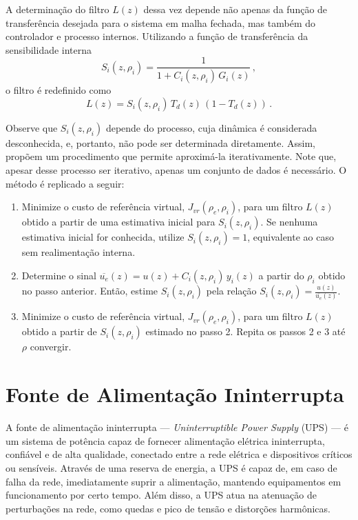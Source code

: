 \documentclass[repeatfields,oneside]{tcc}
\newcommand{\mycdot}{ \, }
\newcommand{\myC}[2][]{ C_{#1} \left( #2 \right) }
\newcommand{\myG}[2][]{ G_{#1} \left( #2 \right) }
\newcommand{\myCzrho}[1]{ \myC[#1]{z, \rho_{#1}} }
\begin{document}
A determinação do filtro $L(z)$ dessa vez depende não apenas da função de transferência desejada para o sistema em malha fechada, mas também do controlador e processo internos.
Utilizando a função de transferência da sensibilidade interna
\begin{equation}\label{eq:VRFT_cascade1_S}
    S_i(z, \rho_i) = \dfrac{ 1 }{ 1 + \myCzrho{i} \mycdot \myG[i]{z} }
    \,,
\end{equation}
o filtro é redefinido como
\begin{equation}\label{eq:VRFT_cascade1_L}
    L(z) = S_i(z, \rho_i) \mycdot T_d(z) \mycdot \left( 1 - T_d(z) \right)
    \,.
\end{equation}

Observe que $S_i(z, \rho_i)$ depende do processo, cuja dinâmica é considerada desconhecida, e, portanto, não pode ser determinada diretamente.
Assim, \textcite{Chrystian2020} propõem um procedimento que permite aproximá-la iterativamente.
Note que, apesar desse processo ser iterativo, apenas um conjunto de dados é necessário.
O método é replicado a seguir:
\begin{enumerate}
    \item Minimize o custo de referência virtual, $J_{vr} \left( \rho_e, \rho_i \right)$, para um filtro $L(z)$ obtido a partir de uma estimativa inicial para $S_i(z, \rho_i)$. Se nenhuma estimativa inicial for conhecida, utilize  $S_i(z, \rho_i) = 1$, equivalente ao caso sem realimentação interna.
    \item Determine o sinal $\overline{u_e}(z) = u(z) + \myCzrho{i} \mycdot y_i(z)$ a partir do $\rho_i$ obtido no passo anterior. Então, estime $S_i(z, \rho_i)$ pela relação $S_i(z, \rho_i) = \frac{u(z)}{\overline{u_e}(z)}$.
    \item Minimize o custo de referência virtual, $J_{vr} \left( \rho_e, \rho_i \right)$, para um filtro $L(z)$ obtido a partir de $S_i(z, \rho_i)$ estimado no passo 2. Repita os passos 2 e 3 até $\rho$ convergir.
\end{enumerate}

\newpage
\section{Fonte de Alimentação Ininterrupta}\label{sec:UPS}


A fonte de alimentação ininterrupta --- \textit{Uninterruptible Power Supply} (UPS) --- é um sistema de potência capaz de fornecer alimentação elétrica ininterrupta, confiável e de alta qualidade, conectado entre a rede elétrica e dispositivos críticos ou sensíveis.
Através de uma reserva de energia, a UPS é capaz de, em caso de falha da rede, imediatamente suprir a alimentação, mantendo equipamentos em funcionamento por certo tempo.
Além disso, a UPS atua na atenuação de perturbações na rede, como quedas e pico de tensão e distorções harmônicas.
\end{document}

